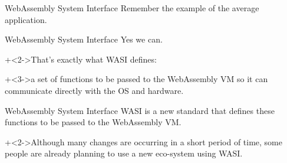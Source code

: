 \begin{frame}[t]{WebAssembly System Interface}{}
    Remember the example of the average application.
    \vspace{2ex}

\end{frame}


\begin{frame}{WebAssembly System Interface}{}
    {\Large Yes we can.}
    \vspace{4ex}

    \onslide+<2->{That's exactly what WASI defines:}
    \vspace{2ex}

    \onslide+<3->{a set of functions to be passed to the WebAssembly VM so it can communicate directly with the OS and hardware.} 
\end{frame}


\begin{frame}{WebAssembly System Interface}{}
    WASI is a new standard that defines these functions to be passed to the WebAssembly VM.
    \vspace{4ex}

    \onslide+<2->{Although many changes are occurring in a short period of time,
    some people are already planning to use a new eco-system using WASI.}
\end{frame}


